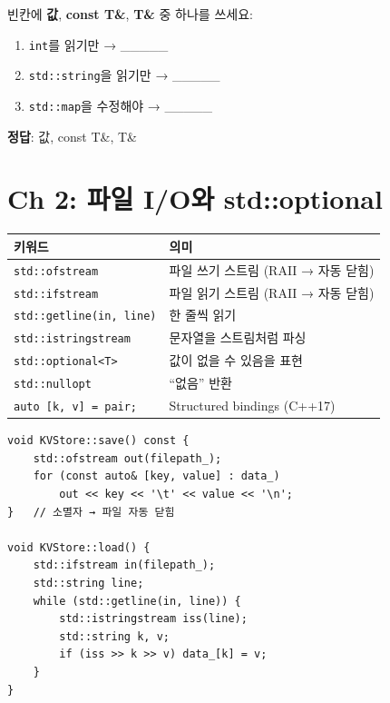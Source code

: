 \documentclass[11pt,a4paper]{article}
\newcommand{\code}[1]{\texttt{#1}}
\begin{document}
\begin{quizbox}[title={Q1-3: 매개변수 전달}]
빈칸에 \textbf{값}, \textbf{const T\&}, \textbf{T\&} 중 하나를 쓰세요:
\begin{enumerate}[nosep]
\item \code{int}를 읽기만 → \_\_\_\_\_
\item \code{std::string}을 읽기만 → \_\_\_\_\_
\item \code{std::map}을 수정해야 → \_\_\_\_\_
\end{enumerate}
\textbf{정답}: 값, const T\&, T\&
\end{quizbox}


\section{Ch 2: 파일 I/O와 std::optional}

\begin{tabularx}{\textwidth}{@{}lX@{}}
\toprule
\textbf{키워드} & \textbf{의미} \\
\midrule
\code{std::ofstream} & 파일 쓰기 스트림 (RAII → 자동 닫힘) \\
\code{std::ifstream} & 파일 읽기 스트림 (RAII → 자동 닫힘) \\
\code{std::getline(in, line)} & 한 줄씩 읽기 \\
\code{std::istringstream} & 문자열을 스트림처럼 파싱 \\
\code{std::optional<T>} & 값이 없을 수 있음을 표현 \\
\code{std::nullopt} & ``없음'' 반환 \\
\code{auto [k, v] = pair;} & Structured bindings (C++17) \\
\bottomrule
\end{tabularx}

\begin{lstlisting}[style=cpp,title={save() / load()}]
void KVStore::save() const {
    std::ofstream out(filepath_);
    for (const auto& [key, value] : data_)
        out << key << '\t' << value << '\n';
}   // 소멸자 → 파일 자동 닫힘

void KVStore::load() {
    std::ifstream in(filepath_);
    std::string line;
    while (std::getline(in, line)) {
        std::istringstream iss(line);
        std::string k, v;
        if (iss >> k >> v) data_[k] = v;
    }
}
\end{lstlisting}
\end{document}

